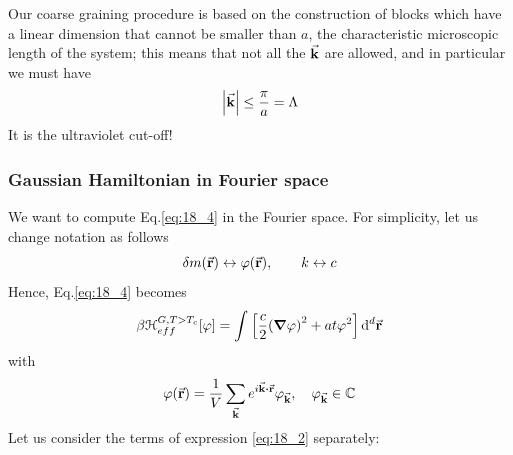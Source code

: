 \documentclass[../../Main/Main.tex]{subfiles}
\begin{document}
\begin{remark}
Our coarse graining procedure is based on the construction of blocks which have a linear dimension that cannot be smaller than \( a \), the characteristic microscopic length of the system; this means that not all the \( \va{k} \)  are allowed, and in particular we must have
\begin{equation*}
\abs{\va{k}} \le \frac{\pi }{a} = \Lambda
\end{equation*}
It is the ultraviolet cut-off!
\end{remark}



\subsubsection{Gaussian Hamiltonian in Fourier space}
We want to compute Eq.\eqref{eq:18_4}  in the Fourier space. For simplicity, let us change notation as follows
\begin{equation*}
  \delta m (\va{r}) \leftrightarrow \varphi (\va{r}), \qquad k \leftrightarrow c
\end{equation*}
Hence, Eq.\eqref{eq:18_4} becomes
\begin{equation}
  \beta \mathcal{H}_{eff}^{G,T>T_c} [\varphi ]= \int_{}^{}  \qty[\frac{c}{2} \qty(\grad \varphi )^2 + a t \varphi  ^2 ] \dd[d]{\va{r}}
  \label{eq:18_2}
\end{equation}
with
\begin{equation*}
  \varphi (\va{r}) = \frac{1}{V} \sum_{\va{k}}^{} e^{i \va{k} \vdot \va{r}} \varphi _{\va{k}}, \quad \varphi _{\va{k}} \in \mathbb{C}
\end{equation*}
Let us consider the terms of expression \eqref{eq:18_2} separately:
\end{document}
